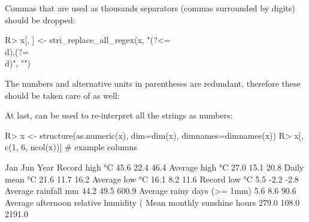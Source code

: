 \documentclass[nojss]{jss}\usepackage[]{graphicx}\usepackage[]{color}
\begin{document}
Commas that are used as thousands separators (commas surrounded
by digits) should be dropped:

\begin{Schunk}
\begin{Sinput}
R> x[, ] <- stri_replace_all_regex(x, "(?<=\\d),(?=\\d)", "")
\end{Sinput}
\end{Schunk}

The numbers and alternative units in parentheses are redundant,
therefore these should be taken care of as well:

\begin{Schunk}
\end{Schunk}

At last,  can be used to re-interpret all the strings
as numbers:

\begin{Schunk}
\begin{Sinput}
R> x <- structure(as.numeric(x), dim=dim(x), dimnames=dimnames(x))
R> x[, c(1, 6, ncol(x))]  # example columns
\end{Sinput}
\begin{Soutput}
                                          Jan   Jun   Year
Record high °C                           45.6  22.4   46.4
Average high °C                          27.0  15.1   20.8
Daily mean °C                            21.6  11.7   16.2
Average low °C                           16.1   8.2   11.6
Record low °C                             5.5  -2.2   -2.8
Average rainfall mm                      44.2  49.5  600.9
Average rainy days (>= 1mm)               5.6   8.6   90.6
Average afternoon relative humidity (%)  47.0  61.0   51.0
Mean monthly sunshine hours             279.0 108.0 2191.0
\end{Soutput}
\end{Schunk}
\end{document}

